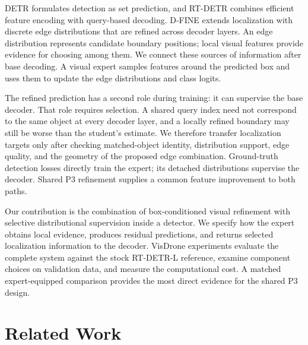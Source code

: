 DETR \cite{carion2020detr} formulates detection as set prediction, and RT-DETR \cite{zhao2024rtdetr} combines efficient feature encoding with query-based decoding. D-FINE \cite{peng2025dfine} extends localization with discrete edge distributions that are refined across decoder layers. An edge distribution represents candidate boundary positions; local visual features provide evidence for choosing among them. We connect these sources of information after base decoding. A visual expert samples features around the predicted box and uses them to update the edge distributions and class logits.


The refined prediction has a second role during training: it can supervise the base decoder. That role requires selection. A shared query index need not correspond to the same object at every decoder layer, and a locally refined boundary may still be worse than the student's estimate. We therefore transfer localization targets only after checking matched-object identity, distribution support, edge quality, and the geometry of the proposed edge combination. Ground-truth detection losses directly train the expert; its detached distributions supervise the decoder. Shared P3 refinement supplies a common feature improvement to both paths.


Our contribution is the combination of box-conditioned visual refinement with selective distributional supervision inside a detector. We specify how the expert obtains local evidence, produces residual predictions, and returns selected localization information to the decoder. VisDrone experiments evaluate the complete system against the stock RT-DETR-L reference, examine component choices on validation data, and measure the computational cost. A matched expert-equipped comparison provides the most direct evidence for the shared P3 design.


\section{Related Work}


